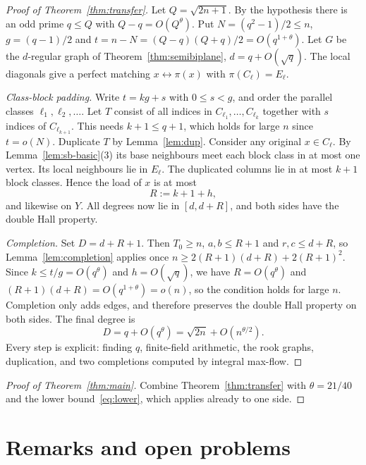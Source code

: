 \documentclass[11pt]{amsart}
\theoremstyle{definition}
\theoremstyle{remark}
\begin{document}
\begin{proof}[Proof of Theorem~\ref{thm:transfer}]
Let $Q=\sqrt{2n+1}$. By the hypothesis there is an odd prime $q\le Q$ with
$Q-q=O(Q^\theta)$. Put $N=(q^2-1)/2\le n$, $g=(q-1)/2$ and $t=n-N=(Q-q)(Q+q)/2=O(q^{1+\theta})$.
Let $G$ be the $d$-regular graph of Theorem~\ref{thm:semibiplane}, $d=q+O(\sqrt q)$. The
local diagonals give a perfect matching $x\leftrightarrow\pi(x)$ with $\pi(C_\ell)=E_\ell$.

\emph{Class-block padding.} Write $t=kg+s$ with $0\le s<g$, and order the parallel classes
$\ell_1,\ell_2,\dots$. Let $T$ consist of all indices in $C_{\ell_1},\dots,C_{\ell_k}$
together with $s$ indices of $C_{\ell_{k+1}}$. This needs $k+1\le q+1$, which holds for
large $n$ since $t=o(N)$. Duplicate $T$ by Lemma~\ref{lem:dup}. Consider any original
$x\in C_\ell$. By Lemma~\ref{lem:sb-basic}(3) its base neighbours meet each block class in at
most one vertex. Its local neighbours lie in $E_\ell$. The duplicated columns lie in at most
$k+1$ block classes. Hence the load of $x$ is at most
\[
  R := k+1+h,
\]
and likewise on $Y$. All degrees now lie in $[d,d+R]$, and both sides have the double Hall
property.

\emph{Completion.} Set $D=d+R+1$. Then $T_0\ge n$, $a,b\le R+1$ and $r,c\le d+R$, so
Lemma~\ref{lem:completion} applies once $n\ge 2(R+1)(d+R)+2(R+1)^2$. Since
$k\le t/g=O(q^\theta)$ and $h=O(\sqrt q)$, we have $R=O(q^\theta)$ and
$(R+1)(d+R)=O(q^{1+\theta})=o(n)$, so the condition holds for large $n$. Completion only adds edges, and therefore
preserves the double Hall property on both sides. The final degree is
\[
  D=q+O(q^\theta)=\sqrt{2n}+O(n^{\theta/2}).
\]
Every step is explicit: finding $q$, finite-field arithmetic, the rook graphs, duplication,
and two completions computed by integral max-flow.
\end{proof}

\begin{proof}[Proof of Theorem~\ref{thm:main}]
Combine Theorem~\ref{thm:transfer} with $\theta=21/40$ \cite{BHP} and the lower
bound~\eqref{eq:lower}, which applies already to one side.
\end{proof}

\section{Remarks and open problems}
\end{document}
